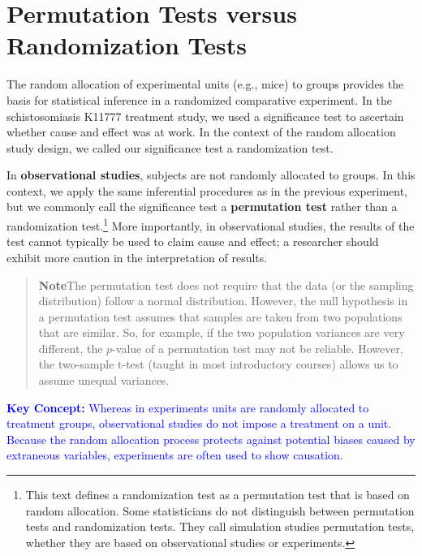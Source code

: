 \documentclass[
]{report}
\begin{document}
\hypertarget{permutation-tests-versus-randomization-tests}{%
\section{\texorpdfstring{\textbf{Permutation Tests versus Randomization Tests}}{Permutation Tests versus Randomization Tests}}\label{permutation-tests-versus-randomization-tests}}

The random allocation of experimental units (e.g., mice) to groups provides the basis for statistical inference in a randomized comparative experiment. In the schistosomiasis K11777 treatment study, we used a significance test to ascertain whether cause and effect was at work. In the context of the random allocation study design,
we called our significance test a randomization test.

In \textbf{observational studies}, subjects are not randomly allocated to groups. In this context, we apply the same inferential procedures as in the previous experiment, but we commonly call the significance test a \textbf{permutation test} rather than a randomization test.\footnote{This text defines a randomization test as a permutation test that is based on random allocation. Some statisticians do not distinguish between permutation tests and randomization tests. They call simulation studies permutation tests, whether they are based on observational studies or experiments.} More importantly, in observational studies, the results of the test cannot typically be used to claim cause and effect; a researcher should exhibit more caution in the interpretation of results.

\begin{quote}
\textbf{Note}The permutation test does not require that the data (or the sampling distribution) follow a normal distribution. However, the null hypothesis in a permutation test assumes that samples are taken from two populations
that are similar. So, for example, if the two population variances are very different, the \(p\)-value of a permutation test may not be reliable. However, the two-sample t-test (taught in most introductory courses) allows us to assume unequal variances.
\end{quote}

\textbf{\textcolor{blue}{Key Concept:}}
\textcolor{blue}{Whereas in experiments units are randomly allocated to treatment groups, observational studies do not impose a treatment on a unit. Because the random allocation process protects against potential biases caused by extraneous variables, experiments are often used to show causation.}
\end{document}
